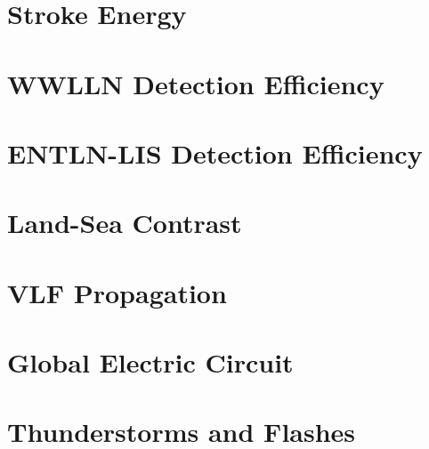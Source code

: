\documentclass [11pt, twoside] {uwthesis}[2012/06/19]
\begin{document}
\chapter{Stroke Energy}
\label{thesis:chapter:energy}




\chapter{WWLLN Detection Efficiency}
\label{thesis:chapter:efficiency}




\chapter{ENTLN-LIS Detection Efficiency}
\label{thesis:chapter:entln-lis}




\chapter{Land-Sea Contrast}
\label{thesis:chapter:landsea}




\chapter{VLF Propagation}
\label{thesis:chapter:prop}





\chapter{Global Electric Circuit}
\label{thesis:chapter:gec}




\chapter{Thunderstorms and Flashes}
\label{thesis:chapter:thunderstorm}
\end{document}
